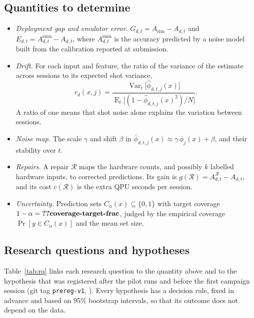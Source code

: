 \subsection{Quantities to determine}
\begin{itemize}
\item \emph{Deployment gap and emulator error.} $G_{d,t}=A_{\mathrm{sim}}-A_{d,t}$ and
$E_{d,t}=A^{\mathrm{emu}}_{d,t}-A_{d,t}$, where $A^{\mathrm{emu}}_{d,t}$ is the accuracy
predicted by a noise model built from the calibration reported at submission.
\item \emph{Drift.} For each input and feature, the ratio of the variance of the estimate across
sessions to its expected shot variance,
\begin{equation}
r_d(x,j)=\frac{\operatorname{Var}_t\big[\hat\phi_{d,t,j}(x)\big]}
{\operatorname{E}_t\big[(1-\hat\phi_{d,t,j}(x)^{2})/N\big]}.
\label{eq:drift}
\end{equation}
A ratio of one means that shot noise alone explains the variation between sessions.
\item \emph{Noise map.} The scale $\gamma$ and shift $\beta$ in
$\bar\phi_{d,t,j}(x)\approx\gamma\,\phi_j(x)+\beta$, and their stability over $t$.
\item \emph{Repairs.} A repair $\mathcal R$ maps the hardware counts, and possibly $k$ labelled
hardware inputs, to corrected predictions. Its gain is $g(\mathcal R)=A^{\mathcal R}_{d,t}-
A_{d,t}$, and its cost $c(\mathcal R)$ is the extra QPU seconds per session.
\item \emph{Uncertainty.} Prediction sets $C_\alpha(x)\subseteq\{0,1\}$ with target coverage
$1-\alpha=\val{coverage-target-frac}$, judged by the empirical coverage
$\Pr[y\in C_\alpha(x)]$ and the mean set size.
\end{itemize}

\subsection{Research questions and hypotheses}
Table~\ref{tab:rq} links each research question to the quantity above and to the hypothesis that
was registered after the pilot runs and before the first campaign session (git tag
\texttt{prereg-v1}, ). Every hypothesis has a decision rule, fixed in advance and
based on 95\% bootstrap intervals, so that its outcome does not depend on the data.

